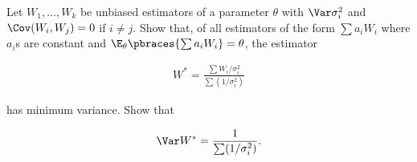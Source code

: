 
\begin{exercise}

Let $W_1, \dots, W_k$ be unbiased estimators of a parameter $\theta$ with $\Var \sigma_i^2$ and $\Cov(W_i, W_j) = 0$ if $i \neq j$.
Show that, of all estimators of the form $\sum a_i W_i$ where $a_i$s are constant and $\E_\theta \pbraces{\sum a_i W_i} = \theta$, the estimator

\begin{align*}
    W^\ast
    =
    \frac
    {
        \sum W_i / \sigma_i^2
    }{
        \sum (1 / \sigma_i^2)
    }
\end{align*}

has minimum variance.
Show that

\begin{align*}
    \Var W^\ast
    =
    \frac
    {
        1
    }{
        \sum (1 / \sigma_i^2)
    }.
\end{align*}

\end{exercise}


